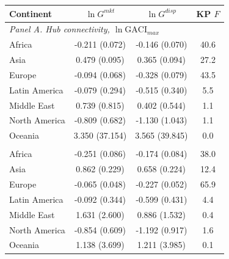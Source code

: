 \begin{tabular}{lccc}
\toprule
Continent & $\ln G^{mkt}$ & $\ln G^{disp}$ & KP $F$ \\
\midrule
\multicolumn{4}{l}{\emph{Panel A. Hub connectivity, $\ln\mathrm{GACI}_{max}$}}\\
Africa & -0.211\sym{***} (0.072) & -0.146\sym{**} (0.070) & 40.6 \\
Asia & 0.479\sym{***} (0.095) & 0.365\sym{***} (0.094) & 27.2 \\
Europe & -0.094 (0.068) & -0.328\sym{***} (0.079) & 43.5 \\
Latin America & -0.079 (0.294) & -0.515 (0.340) & 5.5 \\
Middle East & 0.739 (0.815) & 0.402 (0.544) & 1.1 \\
North America & -0.809 (0.682) & -1.130 (1.043) & 1.1 \\
Oceania & 3.350 (37.154) & 3.565 (39.845) & 0.0 \\
\addlinespace
\multicolumn{4}{l}{\emph{Panel B. Hub quality, $\ln\mathrm{GACI}_{cwm}$}}\\
Africa & -0.251\sym{***} (0.086) & -0.174\sym{**} (0.084) & 38.0 \\
Asia & 0.862\sym{***} (0.229) & 0.658\sym{***} (0.224) & 12.4 \\
Europe & -0.065 (0.048) & -0.227\sym{***} (0.052) & 65.9 \\
Latin America & -0.092 (0.344) & -0.599 (0.431) & 4.4 \\
Middle East & 1.631 (2.600) & 0.886 (1.532) & 0.4 \\
North America & -0.854 (0.609) & -1.192 (0.917) & 1.6 \\
Oceania & 1.138 (3.699) & 1.211 (3.985) & 0.1 \\
\bottomrule
\end{tabular}

